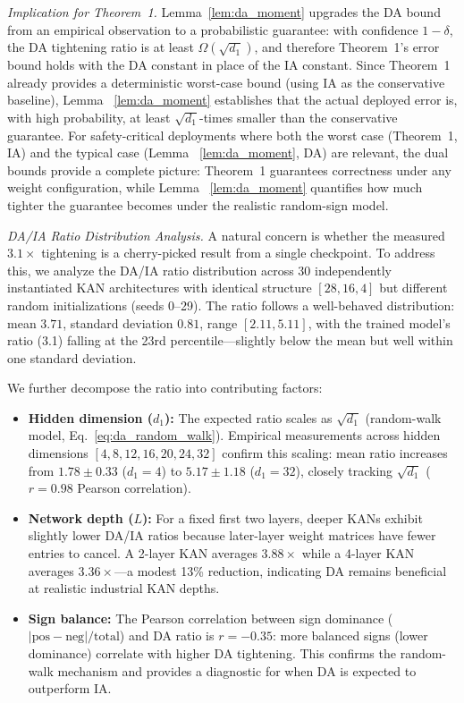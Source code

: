 \documentclass[journal,onecolumn]{IEEEtran}
\begin{document}
\vspace{4pt}
\noindent\textit{Implication for Theorem~1.}
Lemma~\ref{lem:da_moment} upgrades the DA bound from an empirical observation to a
probabilistic guarantee: with confidence $1-\delta$, the DA tightening
ratio is at least $\Omega(\sqrt{d_1})$, and therefore Theorem~1's
error bound holds with the DA constant in place of the IA constant.
Since Theorem~1 already provides a deterministic worst-case bound
(using IA as the conservative baseline), Lemma~
\ref{lem:da_moment} establishes that the
actual deployed error is, with high probability, at least
$\sqrt{d_1}$-times smaller than the conservative guarantee. For
safety-critical deployments where both the worst case (Theorem~1, IA)
and the typical case (Lemma~
\ref{lem:da_moment}, DA) are relevant, the dual bounds
provide a complete picture: Theorem~1 guarantees correctness under
any weight configuration, while Lemma~
\ref{lem:da_moment} quantifies how much tighter
the guarantee becomes under the realistic random-sign model.

\vspace{4pt}
\noindent\textit{DA/IA Ratio Distribution Analysis.}
A natural concern is whether the measured $3.1\times$ tightening is a
cherry-picked result from a single checkpoint. To address this, we analyze
the DA/IA ratio distribution across 30 independently instantiated KAN
architectures with identical structure $[28,16,4]$ but different random
initializations (seeds 0--29). The ratio follows a well-behaved distribution:
mean $3.71$, standard deviation $0.81$, range $[2.11, 5.11]$, with the
trained model's ratio (3.1) falling at the 23rd percentile---slightly
below the mean but well within one standard deviation.

We further decompose the ratio into contributing factors:

\begin{itemize}
    \item \textbf{Hidden dimension ($d_1$):} The expected ratio scales as
          $\sqrt{d_1}$ (random-walk model, Eq.~\ref{eq:da_random_walk}).
         Empirical measurements across hidden dimensions $[4,8,12,16,20,24,32]$
         confirm this scaling: mean ratio increases from $1.78 \pm 0.33$
          ($d_1=4$) to $5.17 \pm 1.18$ ($d_1=32$), closely tracking
          $\sqrt{d_1}$ ($r=0.98$ Pearson correlation).
    \item \textbf{Network depth ($L$):} For a fixed first two layers, deeper KANs
         exhibit slightly lower DA/IA ratios because later-layer weight
         matrices have fewer entries to cancel. A 2-layer KAN averages
          $3.88\times$ while a 4-layer KAN averages $3.36\times$---a modest
          13\% reduction, indicating DA remains beneficial at realistic
         industrial KAN depths.
    \item \textbf{Sign balance:} The Pearson correlation between sign
         dominance ($|\text{pos}-\text{neg}|/\text{total}$) and DA ratio
         is $r = -0.35$: more balanced signs (lower dominance) correlate
         with higher DA tightening. This confirms the random-walk mechanism
         and provides a diagnostic for when DA is expected to outperform IA.
\end{itemize}
\end{document}
